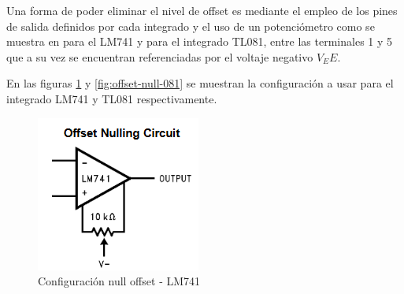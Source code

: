 Una forma de poder eliminar el nivel de offset es mediante el empleo de los pines de salida definidos por cada integrado y el uso de un potenciómetro como se muestra en \cite{National1998LM741} para el LM741 y \cite{TI_TL08x} para el integrado TL081, entre las terminales 1 y 5 que a su vez se encuentran referenciadas por el voltaje negativo $V_EE$.

En las figuras \ref{fig:offset-null-741} y \ref{fig:offset-null-081} se muestran la configuración a usar para el integrado LM741 y TL081 respectivamente.

\begin{figure}[h]
	\centering
	\begin{minipage}{0.3\linewidth}
		\centering
		\includegraphics[width=\linewidth]{media/offset-null-741}
		\caption{Configuración null offset - LM741}
		\label{fig:offset-null-741}
	\end{minipage}
	\hfill
	\begin{minipage}{0.3\linewidth}
		\centering

\end{minipage}
\end{figure}
